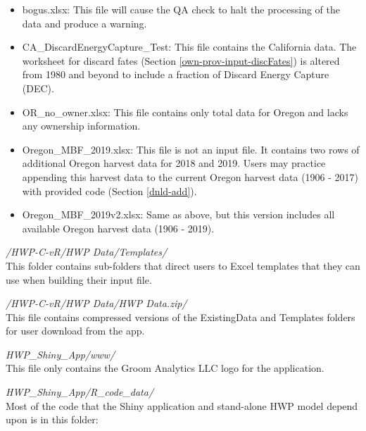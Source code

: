 \documentclass[
  openany]{book}
\begin{document}
\begin{itemize}
\item
  bogus.xlsx: This file will cause the QA check to halt the processing of the data and produce a warning.
\item
  CA\_DiscardEnergyCapture\_Test: This file contains the California data. The worksheet for discard fates (Section \ref{own-prov-input-discFates}) is altered from 1980 and beyond to include a fraction of Discard Energy Capture (DEC).
\item
  OR\_no\_owner.xlsx: This file contains only total data for Oregon and lacks any ownership information.
\item
  Oregon\_MBF\_2019.xlsx: This file is not an input file. It contains two rows of additional Oregon harvest data for 2018 and 2019. Users may practice appending this harvest data to the current Oregon harvest data (1906 - 2017) with provided code (Section \ref{dnld-add}).
\item
  Oregon\_MBF\_2019v2.xlsx: Same as above, but this version includes all available Oregon harvest data (1906 - 2019).
\end{itemize}

\emph{/HWP-C-vR/HWP Data/Templates/}\\
This folder contains sub-folders that direct users to Excel templates that they can use when building their input file.

\emph{/HWP-C-vR/HWP Data/HWP Data.zip/}\\
This file contains compressed versions of the ExistingData and Templates folders for user download from the app.

\emph{HWP\_Shiny\_App/www/}\\
This file only contains the Groom Analytics LLC logo for the application.

\emph{HWP\_Shiny\_App/R\_code\_data/}\\
Most of the code that the Shiny application and stand-alone HWP model depend upon is in this folder:
\end{document}
